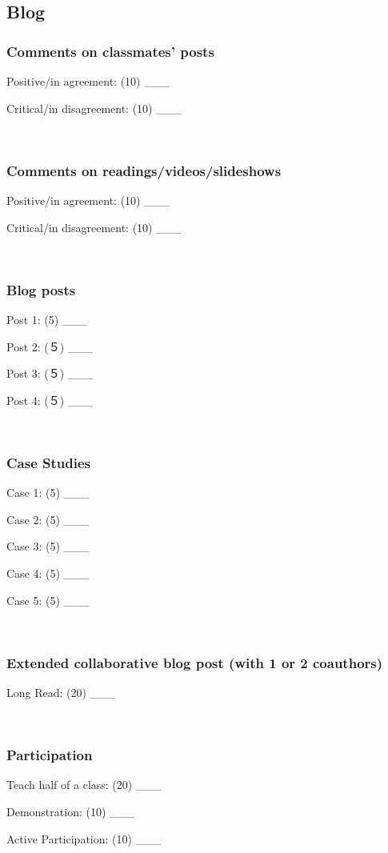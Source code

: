 \documentclass[
  letterpaper]{article}
\author{George Matthews}
\date{13 May, 2020}
\begin{document}
\thispagestyle{fancy}

\hypertarget{blog}{%
\subsection{Blog}\label{blog}}

\hypertarget{comments-on-classmates-posts}{%
\subsubsection{Comments on classmates'
posts}\label{comments-on-classmates-posts}}

Positive/in agreement: (10) \_\_\_

Critical/in disagreement: (10) \_\_\_

~

\hypertarget{comments-on-readingsvideosslideshows}{%
\subsubsection{Comments on
readings/videos/slideshows}\label{comments-on-readingsvideosslideshows}}

Positive/in agreement: (10) \_\_\_

Critical/in disagreement: (10) \_\_\_

~

\hypertarget{blog-posts}{%
\subsubsection{Blog posts}\label{blog-posts}}

Post 1: (5) \_\_\_

Post 2: (５) \_\_\_

Post 3: (５) \_\_\_

Post 4: (５) \_\_\_

~

\hypertarget{case-studies}{%
\subsubsection{Case Studies}\label{case-studies}}

Case 1: (5) \_\_\_

Case 2: (5) \_\_\_

Case 3: (5) \_\_\_

Case 4: (5) \_\_\_

Case 5: (5) \_\_\_

~

\hypertarget{extended-collaborative-blog-post-with-1-or-2-coauthors}{%
\subsubsection{Extended collaborative blog post (with 1 or 2
coauthors)}\label{extended-collaborative-blog-post-with-1-or-2-coauthors}}

Long Read: (20) \_\_\_

~

\hypertarget{participation}{%
\subsubsection{Participation}\label{participation}}

Teach half of a class: (20) \_\_\_

Demonstration: (10) \_\_\_

Active Participation: (10) \_\_\_
\end{document}

